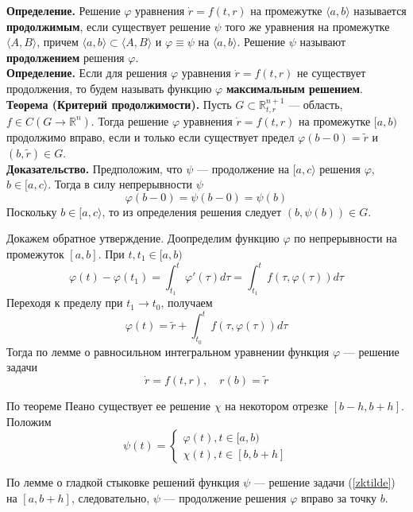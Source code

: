 \textbf{Определение.} Решение $\varphi$ уравнения $\dot{r} = f(t,r)$ на промежутке $\langle a,b \rangle$ называется \textbf{продолжимым}, если существует решение $\psi$ того же уравнения на промежутке $\langle A, B \rangle$, причем $\langle a,b \rangle \subset \langle A,B \rangle$ и $\varphi \equiv \psi$ на $\langle a,b \rangle$. Решение $\psi$ называют \textbf{продолжением} решения $\varphi$.\\

\noindent \textbf{Определение.} Если для решения $\varphi$ уравнения $\dot{r} = f(t,r)$ не существует продолжения, то будем называть функцию $\varphi$ \textbf{максимальным решением}.\\

\noindent \textbf{Теорема (Критерий продолжимости).} Пусть $G \subset \mathbb{R}_{t,r}^{n+1}$ --- область, $f \in C(G \to \mathbb{R}^{n})$. Тогда решение $\varphi$ уравнения $\dot{r} = f(t,r)$ на промежутке $[a,b)$ продолжимо вправо, если и только если существует предел $\varphi(b - 0) = \widetilde{r}$ и $(b, \widetilde{r}) \in G$.\\

\noindent \textbf{Доказательство.} Предположим, что $\psi$ --- продолжение на $[a,c\rangle$ решения $\varphi$, $b \in [a,c\rangle$. Тогда в силу непрерывности $\psi$
\begin{equation*}
    \varphi(b-0) = \psi(b-0) = \psi(b)
\end{equation*}
Поскольку $b \in [a,c\rangle$, то из определения решения следует $(b, \psi(b)) \in G$.

Докажем обратное утверждение. Доопределим функцию $\varphi$ по непрерывности на промежуток $[a,b]$. При $t,t_1 \in [a,b)$
\begin{equation*}
    \varphi(t) - \varphi(t_1) = \int_{t_1}^t \varphi'(\tau)d\tau = \int_{t_1}^t f(\tau, \varphi(\tau))d\tau
\end{equation*}
Переходя к пределу при $t_1 \to t_0$, получаем
\begin{equation*}
    \varphi(t) = \widetilde{r} + \int_{t_0}^t f(\tau, \varphi(\tau))d\tau
\end{equation*}
Тогда по лемме о равносильном интегральном уравнении функция $\varphi$ --- решение задачи
\begin{equation}
    \dot{r} = f(t,r), \quad r(b) = \widetilde{r} \label{zktilde}
\end{equation}

По теореме Пеано существует ее решение $\chi$ на некотором отрезке $[b-h, b+h]$. Положим
\begin{equation*}
    \psi(t) = \begin{cases}
    \varphi(t), t \in [a,b)\\
    \chi(t), t \in [b, b + h]
    \end{cases}
\end{equation*}

По лемме о гладкой стыковке решений функция $\psi$ --- решение задачи (\ref{zktilde}) на $[a,b+h]$, следовательно, $\psi$ --- продолжение решения $\varphi$ вправо за точку $b$.